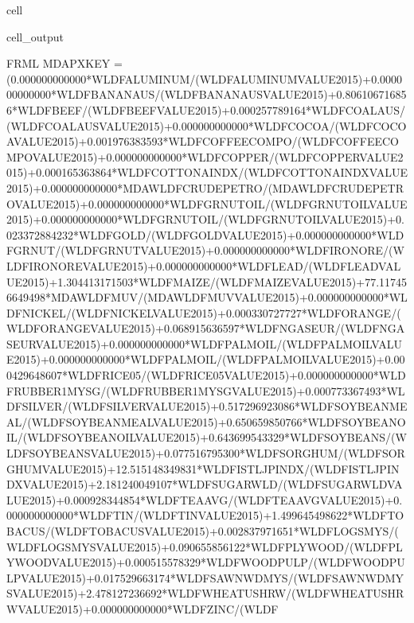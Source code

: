 \documentclass[letterpaper,10pt,english]{jupyterBook}
\begin{document}
\begin{sphinxuseclass}{cell}
\begin{sphinxVerbatimOutput}
\begin{sphinxuseclass}{cell_output}
\begin{sphinxVerbatim}[commandchars=\\\{\}]
FRML  \PYGZlt{}\PYGZgt{} MDAPXKEY = (0.000000000000*WLDFALUMINUM/(WLDFALUMINUM\PYGZus{}VALUE\PYGZus{}2015)+0.000000000000*WLDFBANANA\PYGZus{}US/(WLDFBANANA\PYGZus{}US\PYGZus{}VALUE\PYGZus{}2015)+0.806106716856*WLDFBEEF/(WLDFBEEF\PYGZus{}VALUE\PYGZus{}2015)+0.000257789164*WLDFCOAL\PYGZus{}AUS/(WLDFCOAL\PYGZus{}AUS\PYGZus{}VALUE\PYGZus{}2015)+0.000000000000*WLDFCOCOA/(WLDFCOCOA\PYGZus{}VALUE\PYGZus{}2015)+0.001976383593*WLDFCOFFEE\PYGZus{}COMPO/(WLDFCOFFEE\PYGZus{}COMPO\PYGZus{}VALUE\PYGZus{}2015)+0.000000000000*WLDFCOPPER/(WLDFCOPPER\PYGZus{}VALUE\PYGZus{}2015)+0.000165363864*WLDFCOTTON\PYGZus{}A\PYGZus{}INDX/(WLDFCOTTON\PYGZus{}A\PYGZus{}INDX\PYGZus{}VALUE\PYGZus{}2015)+0.000000000000*MDAWLDFCRUDE\PYGZus{}PETRO/(MDAWLDFCRUDE\PYGZus{}PETRO\PYGZus{}VALUE\PYGZus{}2015)+0.000000000000*WLDFGRNUT\PYGZus{}OIL/(WLDFGRNUT\PYGZus{}OIL\PYGZus{}VALUE\PYGZus{}2015)+0.000000000000*WLDFGRNUT\PYGZus{}OIL/(WLDFGRNUT\PYGZus{}OIL\PYGZus{}VALUE\PYGZus{}2015)+0.023372884232*WLDFGOLD/(WLDFGOLD\PYGZus{}VALUE\PYGZus{}2015)+0.000000000000*WLDFGRNUT/(WLDFGRNUT\PYGZus{}VALUE\PYGZus{}2015)+0.000000000000*WLDFIRON\PYGZus{}ORE/(WLDFIRON\PYGZus{}ORE\PYGZus{}VALUE\PYGZus{}2015)+0.000000000000*WLDFLEAD/(WLDFLEAD\PYGZus{}VALUE\PYGZus{}2015)+1.304413171503*WLDFMAIZE/(WLDFMAIZE\PYGZus{}VALUE\PYGZus{}2015)+77.117456649498*MDAWLDFMUV/(MDAWLDFMUV\PYGZus{}VALUE\PYGZus{}2015)+0.000000000000*WLDFNICKEL/(WLDFNICKEL\PYGZus{}VALUE\PYGZus{}2015)+0.000330727727*WLDFORANGE/(WLDFORANGE\PYGZus{}VALUE\PYGZus{}2015)+0.068915636597*WLDFNGAS\PYGZus{}EUR/(WLDFNGAS\PYGZus{}EUR\PYGZus{}VALUE\PYGZus{}2015)+0.000000000000*WLDFPALM\PYGZus{}OIL/(WLDFPALM\PYGZus{}OIL\PYGZus{}VALUE\PYGZus{}2015)+0.000000000000*WLDFPALM\PYGZus{}OIL/(WLDFPALM\PYGZus{}OIL\PYGZus{}VALUE\PYGZus{}2015)+0.000429648607*WLDFRICE\PYGZus{}05/(WLDFRICE\PYGZus{}05\PYGZus{}VALUE\PYGZus{}2015)+0.000000000000*WLDFRUBBER1\PYGZus{}MYSG/(WLDFRUBBER1\PYGZus{}MYSG\PYGZus{}VALUE\PYGZus{}2015)+0.000773367493*WLDFSILVER/(WLDFSILVER\PYGZus{}VALUE\PYGZus{}2015)+0.517296923086*WLDFSOYBEAN\PYGZus{}MEAL/(WLDFSOYBEAN\PYGZus{}MEAL\PYGZus{}VALUE\PYGZus{}2015)+0.650659850766*WLDFSOYBEAN\PYGZus{}OIL/(WLDFSOYBEAN\PYGZus{}OIL\PYGZus{}VALUE\PYGZus{}2015)+0.643699543329*WLDFSOYBEANS/(WLDFSOYBEANS\PYGZus{}VALUE\PYGZus{}2015)+0.077516795300*WLDFSORGHUM/(WLDFSORGHUM\PYGZus{}VALUE\PYGZus{}2015)+12.515148349831*WLDFISTL\PYGZus{}JP\PYGZus{}INDX/(WLDFISTL\PYGZus{}JP\PYGZus{}INDX\PYGZus{}VALUE\PYGZus{}2015)+2.181240049107*WLDFSUGAR\PYGZus{}WLD/(WLDFSUGAR\PYGZus{}WLD\PYGZus{}VALUE\PYGZus{}2015)+0.000928344854*WLDFTEA\PYGZus{}AVG/(WLDFTEA\PYGZus{}AVG\PYGZus{}VALUE\PYGZus{}2015)+0.000000000000*WLDFTIN/(WLDFTIN\PYGZus{}VALUE\PYGZus{}2015)+1.499645498622*WLDFTOBAC\PYGZus{}US/(WLDFTOBAC\PYGZus{}US\PYGZus{}VALUE\PYGZus{}2015)+0.002837971651*WLDFLOGS\PYGZus{}MYS/(WLDFLOGS\PYGZus{}MYS\PYGZus{}VALUE\PYGZus{}2015)+0.090655856122*WLDFPLYWOOD/(WLDFPLYWOOD\PYGZus{}VALUE\PYGZus{}2015)+0.000515578329*WLDFWOODPULP/(WLDFWOODPULP\PYGZus{}VALUE\PYGZus{}2015)+0.017529663174*WLDFSAWNWD\PYGZus{}MYS/(WLDFSAWNWD\PYGZus{}MYS\PYGZus{}VALUE\PYGZus{}2015)+2.478127236692*WLDFWHEAT\PYGZus{}US\PYGZus{}HRW/(WLDFWHEAT\PYGZus{}US\PYGZus{}HRW\PYGZus{}VALUE\PYGZus{}2015)+0.000000000000*WLDFZINC/(WLDF
\end{sphinxVerbatim}
\end{sphinxuseclass}
\end{sphinxVerbatimOutput}
\end{sphinxuseclass}
\end{document}
